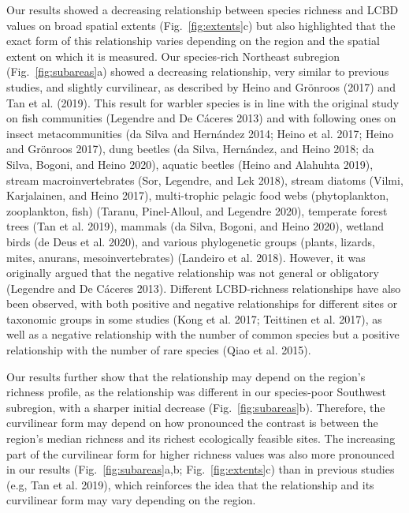 \documentclass[10pt,oneside]{article}
\begin{document}
Our results showed a decreasing relationship between species richness
and LCBD values on broad spatial extents (Fig.~\ref{fig:extents}c) but
also highlighted that the exact form of this relationship varies
depending on the region and the spatial extent on which it is measured.
Our species-rich Northeast subregion (Fig.~\ref{fig:subareas}a) showed a
decreasing relationship, very similar to previous studies, and slightly
curvilinear, as described by Heino and Grönroos (2017) and Tan et al.
(2019). This result for warbler species is in line with the original
study on fish communities (Legendre and De Cáceres 2013) and with
following ones on insect metacommunities (da Silva and Hernández 2014;
Heino et al. 2017; Heino and Grönroos 2017), dung beetles (da Silva,
Hernández, and Heino 2018; da Silva, Bogoni, and Heino 2020), aquatic
beetles (Heino and Alahuhta 2019), stream macroinvertebrates (Sor,
Legendre, and Lek 2018), stream diatoms (Vilmi, Karjalainen, and Heino
2017), multi-trophic pelagic food webs (phytoplankton, zooplankton,
fish) (Taranu, Pinel-Alloul, and Legendre 2020), temperate forest trees
(Tan et al. 2019), mammals (da Silva, Bogoni, and Heino 2020), wetland
birds (de Deus et al. 2020), and various phylogenetic groups (plants,
lizards, mites, anurans, mesoinvertebrates) (Landeiro et al. 2018).
However, it was originally argued that the negative relationship was not
general or obligatory (Legendre and De Cáceres 2013). Different
LCBD-richness relationships have also been observed, with both positive
and negative relationships for different sites or taxonomic groups in
some studies (Kong et al. 2017; Teittinen et al. 2017), as well as a
negative relationship with the number of common species but a positive
relationship with the number of rare species (Qiao et al. 2015).

Our results further show that the relationship may depend on the
region's richness profile, as the relationship was different in our
species-poor Southwest subregion, with a sharper initial decrease
(Fig.~\ref{fig:subareas}b). Therefore, the curvilinear form may depend
on how pronounced the contrast is between the region's median richness
and its richest ecologically feasible sites. The increasing part of the
curvilinear form for higher richness values was also more pronounced in
our results (Fig.~\ref{fig:subareas}a,b; Fig.~\ref{fig:extents}c) than
in previous studies (e.g, Tan et al. 2019), which reinforces the idea
that the relationship and its curvilinear form may vary depending on the
region.
\end{document}
